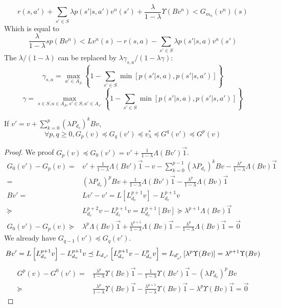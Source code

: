 \[
    r(s,a') + \sum^{}_{s' \in S} \lambda p(s' | s, a') v^{n}(s') + \frac{\lambda}{1 - \lambda} \Upsilon(B v^n) < G_{m_n}(v^n) (s)
\]
Which is equal to
\[
    \frac{\lambda}{1 - \lambda} sp(B v^{n}) < L v^{n}(s) - r(s,a) - \sum^{}_{s' \in S}  \lambda p(s' | s, a) v^{n}(s')
\]
The $ \lambda/(1 - \lambda) $ can be replaced by $ \lambda\gamma_{s,a} / (1 - \lambda \gamma) $:
\[
    \gamma_{s,a} = \max_{a' \in A_S} \left\{ 1 - \sum^{}_{s' \in S} \min \left[ p(s'|s,a), p(s'|s,a') \right] \right\}
\]
\[
    \gamma = \max_{s\in S, a \in A_S, s' \in S, a' \in A_{s'}} \left\{ 1 - \sum^{}_{s' \in S} \min \left[ p(s'|s,a), p(s'|s,a') \right] \right\}
\]
\begin{proposition}
    If $ v' = v + \sum^{p}_{k=0} {(\lambda P_{d_{v}})}^k Bv $,
    \[
        \forall p, q \ge 0, G_{p}(v) \preceq G_{q}(v') \preceq v^{*}_{\lambda} \preceq G^{q}(v') \preceq G^{p}(v)
    \]
    \begin{proof}
        We proof $ G_p(v) \preceq G_0(v') = v' + \frac{1}{1-\lambda} \Lambda(Bv') \vec{1} $.
        \begin{align*}
            G_0(v') - G_p(v)=& v' + \frac{1}{1 - \lambda} \Lambda(Bv') \vec{1} - v - \sum^{p-1}_{k=0} {(\lambda P_{d_v})}^{k}Bv - \frac{\lambda^p}{1 - \lambda} \Lambda(Bv) \vec{1} \\
            =& {(\lambda P_{d_v})}^p Bv + \frac{1}{1 - \lambda} \Lambda(Bv') \vec{1} - \frac{\lambda^p}{1 - \lambda} \Lambda(Bv) \vec{1} \\
            Bv' =& Lv' - v' = L [ L^{p+1}_{d_v} v] - L^{p+1}_{d_v}v \\
            \succeq & L^{p+2}_{d_v}v - L^{p+1}_{d_v} v = L^{p+1}_{d_v} [Bv] \succeq \lambda^{p+1} \Lambda(Bv) \vec{1}\\
            G_0(v') - G_p(v) \succeq& \lambda^p \Lambda(Bv) \vec{1} + \frac{\lambda^{p+1}}{1 - \lambda} \Lambda(Bv) \vec{1} - \frac{\lambda^p}{1 - \lambda} \Lambda(Bv) \vec{1} = \vec{0}
        \end{align*}
        We already have $ G_{q-1}(v') \preceq G_{q}(v') $.
        \[
            Bv' = L\left[ L^{p+1}_{d_v}v \right] - L^{p+1}_{d_v}v
            \preceq L_{d_{v'}}\left[ L^{p+1}_{d_v}v - L^{p}_{d_v}v \right]
            = L_{d'_{v'}} \left[ \lambda^p \Upsilon(Bv) \right]
            = \lambda^{p+1} \Upsilon(Bv)\\
        \]
        \begin{align*}
            G^{p} (v) - G^{0}(v') =& \frac{\lambda^p}{1 - \lambda} \Upsilon(Bv) \vec{1} - \frac{1}{1 - \lambda} \Upsilon(Bv') \vec{1} - {(\lambda P_{d_v})}^p Bv\\
            \succeq& \frac{\lambda^p}{1 - \lambda} \Upsilon(Bv) \vec{1} - \frac{\lambda^{p+1}}{1 - \lambda} \Upsilon(Bv)\vec{1} - \lambda^{p} \Upsilon(Bv) \vec{1} = \vec{0}
        \end{align*}
    \end{proof}
\end{proposition}

